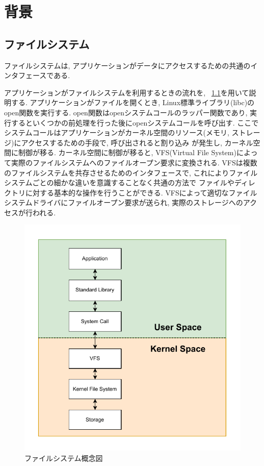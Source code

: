 \documentclass[a4paper,11pt]{jreport}
\begin{document}
\chapter{背景}

\section{ファイルシステム}
ファイルシステムは, アプリケーションがデータにアクセスするための共通のインタフェースである.

アプリケーションがファイルシステムを利用するときの流れを, \figurename~\ref{fig:Filesystem}を用いて説明する. 
アプリケーションがファイルを開くとき, Linux標準ライブラリ(libc)のopen関数を実行する. open関数はopenシステムコールのラッパー関数であり,
実行するといくつかの前処理を行った後にopenシステムコールを呼び出す. 
ここでシステムコールはアプリケーションがカーネル空間のリソース(メモリ, ストレージ)にアクセスするための手段で, 呼び出されると割り込み
が発生し, カーネル空間に制御が移る.
カーネル空間に制御が移ると, VFS(Virtual File System)によって実際のファイルシステムへのファイルオープン要求に変換される.
VFSは複数のファイルシステムを共存させるためのインタフェースで, これによりファイルシステムごとの細かな違いを意識することなく共通の方法で
ファイルやディレクトリに対する基本的な操作を行うことができる. VFSによって適切なファイルシステムドライバにファイルオープン要求が送られ,
実際のストレージへのアクセスが行われる. 

\begin{figure}[h]
	\begin{minipage}[b]{1\columnwidth}
		\centering
		\includegraphics[width=0.9\linewidth]{./figure/filesystem.pdf}
		\caption{ファイルシステム概念図}
		\label{fig:Filesystem}
	\end{minipage}
\end{figure}
\end{document}

